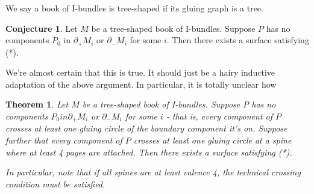 \documentclass[12pt]{amsart}
\newtheorem{thm}[theorem]{Theorem}
\theoremstyle{definition}
\newtheorem{conj}[theorem]{Conjecture}
\newcommand{\bd}{\partial}
\begin{document}
We say a book of I-bundles is tree-shaped if its gluing graph is a tree.

\begin{conj}


Let $M$ be a tree-shaped book of I-bundles. Suppose $P$ has no components $P_0$
in $\bd_+M_i$ or $\bd_-M_i$ for some $i$. Then there exists a surface
satisfying (*).

\end{conj}

We're almost certain that this is true. It should just be a hairy inductive
adaptation of the above argument. In particular, it is totally unclear how

\begin{thm}

Let $M$ be a tree-shaped book of I-bundles. Suppose $P$ has no components $P_0
in \bd_+M_i$ or $\bd_-M_i$ for some $i$ - that is, every component of $P$
crosses at least one gluing circle of the boundary component it's on. Suppose
further that every component of $P$ crosses at least one gluing circle at
a spine where at least 4 pages are attached. Then there exists a surface
satisfying (*).

In particular, note that if all spines are at least valence 4, the technical
crossing condition must be satisfied.

\end{thm}
\end{document}
